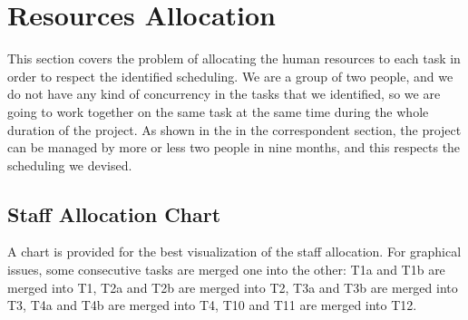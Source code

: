 \section{Resources Allocation}
This section covers the problem of allocating the human resources to each task in order to respect the identified scheduling.
We are a group of two people, and we do not have any kind of concurrency in the tasks that we identified, so we are going to work together on the same task at the same time during the whole duration of the project.
As shown in the  in the correspondent section, the project can be managed by more or less two people in nine months, and this respects the scheduling we devised.
%
\subsection{Staff Allocation Chart}
A chart is provided for the best visualization of the staff allocation.
For graphical issues, some consecutive tasks are merged one into the other: T1a and T1b are merged into T1, T2a and T2b are merged into T2, T3a and T3b are merged into T3, T4a and T4b are merged into T4, T10 and T11 are merged into T12.
\begin{center}
	\begin{ganttchart}[hgrid=true, x unit=2.4mm, link bulge=0.75]{1}{42}
		  \\
		\\
\end{ganttchart}
\end{center}
%
